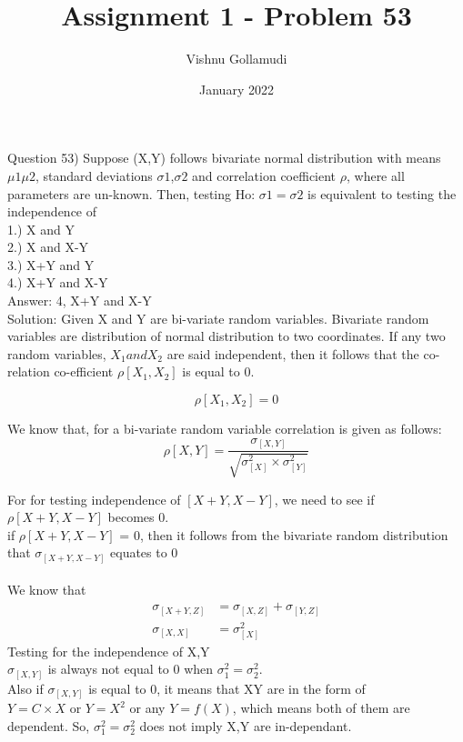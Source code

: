 \documentclass{article}
\title{Assignment 1 - Problem 53}
\author{Vishnu Gollamudi}
\date{January 2022}
\begin{document}
\maketitle

Question 53) Suppose (X,Y) follows bivariate normal distribution with means $\mu1  \mu2$, standard deviations $\sigma1$,$\sigma2$ and correlation coefficient $\rho$, where all parameters are un-known. Then, testing Ho: $\sigma1=\sigma2$ is equivalent to testing the independence of  
\\
1.) X and Y \\
2.) X and X-Y \\
3.) X+Y and Y \\
4.) X+Y and X-Y \\

Answer: 4, X+Y and X-Y \\
Solution:
Given X and Y are bi-variate random variables.  Bivariate random variables are distribution of normal distribution to two coordinates. If any two random variables, $ X_1 and X_2$ are said independent, then it follows that the co-relation co-efficient $\rho[X_1,X_2]$ is equal to 0. \smallskip

\begin{equation*}
\rho[X_1,X_2]  = 0
\end{equation*}

We know that, for a bi-variate random variable correlation is given as follows:
\begin{equation*}
    \rho[X,Y] = \frac{\sigma_[X,Y] } {\sqrt{\sigma_[X]^2 \times \sigma_[Y]^2}}
\end{equation*}


For for testing independence of $[X+Y, X-Y]$, we need to see if  $\rho[X+Y,X-Y]$ becomes 0.\\
if  $\rho[X+Y,X-Y]$  = 0, then it follows from the bivariate random distribution that $\sigma_{[X+Y,X-Y]}$ equates to 0\\
\\
We know that
\\
\begin{align}
  \sigma_{[X+Y,Z]} &= \sigma_{[X,Z]} + \sigma_{[Y,Z]} \\
  \sigma_{[X,X]} &= \sigma_{[X]}^2 
\end{align}
Testing for the independence of X,Y\\
$\sigma_{[X,Y]}$ is always not equal to 0 when $\sigma_1^2 = \sigma_2^2$.\\
Also if $\sigma_{[X,Y]}$ is equal to 0, it means that XY are in the form of\\
$Y = C\times X$ or $Y=X^2$ or any $Y = f(X)$, which means both of them are dependent.
So, $\sigma_1^2 = \sigma_2^2$ does not imply X,Y are in-dependant.\\
\end{document}
